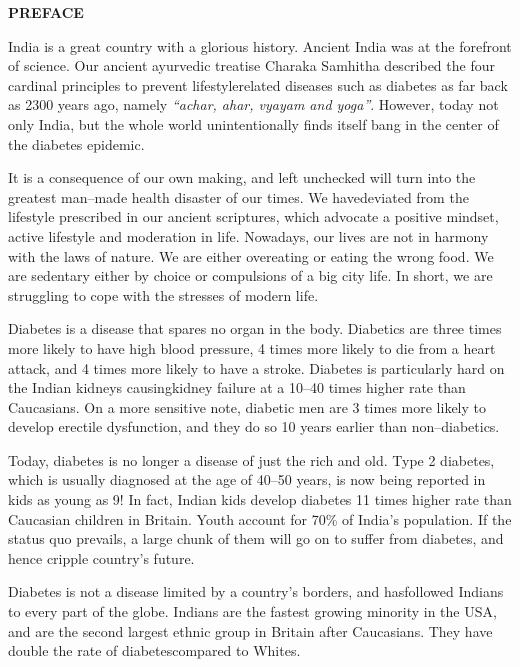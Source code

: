 \thispagestyle{empty}


\begin{center}
\Huge\textbf{PREFACE}
\end{center}

\vskip 20pt

India is a great country with a glorious history. Ancient India was at the forefront of science. Our ancient ayurvedic treatise Charaka Samhitha described the four cardinal principles to prevent lifestyle\break related diseases such as diabetes as far back as 2300 years ago, namely \textit{“achar, ahar, vyayam and yoga”}. However, today not only India, but the whole world unintentionally finds itself bang in the center of the diabetes epidemic.

It is a consequence of our own making, and left unchecked will turn into the greatest man–made health disaster of our times. We have\break deviated from the lifestyle prescribed in our ancient scriptures, which advocate a positive mindset, active lifestyle and moderation in life. Nowadays, our lives are not in harmony with the laws of nature. We are either overeating or eating the wrong food. We are sedentary either by choice or compulsions of a big city life. In short, we are struggling to cope with the stresses of modern life.

Diabetes is a disease that spares no organ in the body. Diabetics are three times more likely to have high blood pressure, 4 times more likely to die from a heart attack, and 4 times more likely to have a stroke. Diabetes is particularly hard on the Indian kidneys causing\break kidney failure at a 10–40 times higher rate than Caucasians. On a more sensitive note, diabetic men are 3 times more likely to develop erectile dysfunction, and they do so 10 years earlier than non–diabetics.

Today, diabetes is no longer a disease of just the rich and old. Type 2 diabetes, which is usually diagnosed at the age of 40–50 years, is now being reported in kids as young as 9! In fact, Indian kids develop diabetes 11 times higher rate than Caucasian children in Britain. Youth account for 70\% of India’s population. If the status quo prevails, a large chunk of them will go on to suffer from diabetes, and hence cripple country’s future.

Diabetes is not a disease limited by a country’s borders, and has\break followed Indians to every part of the globe. Indians are the fastest growing minority in the USA, and are the second largest ethnic group in Britain after Caucasians. They have double the rate of diabetes\break compared to Whites.

